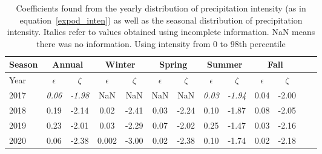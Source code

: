 \begin{table}[htb]
  \begin{center}
    \begin{tabular}{|l|*{11}{c|}r|}
      \hline
      Season    &       \multicolumn{2}{|c|}{Annual}          & \multicolumn{2}{|c|}{Winter}& \multicolumn{2}{|c|}{Spring}  & \multicolumn{2}{|c|}{Summer} &\multicolumn{2}{|c|}{Fall}  \\
      \hline
      Year      & $\epsilon $ & $\zeta$  &  $\epsilon $ & $\zeta$  &  $\epsilon $ & $\zeta$  &  $\epsilon $ & $\zeta$  & $\epsilon $ & $\zeta$ \\
      \hline
      2017      & \textit{0.06}  & \textit{-1.98}  & NaN & NaN & NaN & NaN & \textit{0.03}  & \textit{-1.94}  & 0.04  & -2.00  \\
      2018      & 0.19           & -2.14  & 0.02 & -2.41 & 0.03 & -2.24  & 0.10  & -1.87  & 0.08 & -2.05  \\
      2019      & 0.23           & -2.01  & 0.03 & -2.29 & 0.07 & -2.02 & 0.25 & -1.47 & 0.03 & -2.16  \\
      2020      & 0.06          & -2.38  & 0.002 & -3.00 & 0.02 & -2.38 & 0.10  & -1.74 & 0.02 & -2.18\\
      \hline
    \end{tabular}
  \end{center}
  \caption[Year comparison of coefficients for precipitation
    intensity using 0 to 98th percentile] {\label{fourthtable}Coefficients found from the yearly
    distribution of precipitation intensity (as in equation~\ref{expod_inten}) as
    well as the seasonal distribution of precipitation
    intensity. Italics refer to values obtained using incomplete
    information. NaN means there was no information. Using intensity from 0 to 98th percentile}
\end{table}
